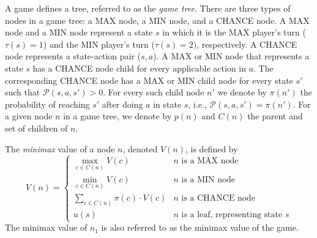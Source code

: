 \documentclass[runningheads]{llncs}
\newcommand{\MM}{\mathit{V}}
\newcommand{\rootnode}{\mathit{n_1}}
\begin{document}
A game defines a tree, referred to as the \emph{game tree}. There are three types of nodes in a game tree: a MAX node, a MIN node, and a CHANCE node. 
A MAX node and a MIN node represent a state $s$ in which it is the MAX player's  turn ($\tau(s)=1$) and the MIN player's turn ($\tau(s)=2)$, respectively. 
A CHANCE node represents a state-action pair ($s,a$). 
A MAX or MIN node that represents a state $s$ 
has a CHANCE node child for every applicable action in $a$. 
The corresponding CHANCE node has a MAX or MIN child node for every state $s'$ 
such that $\mathcal{P}(s,a,s')>0$. For every such child node $n'$ we denote by $\pi(n')$ the probability of reaching $s'$ after doing $a$ in state $s$, i.e., $\mathcal{P}(s,a,s')=\pi(n')$. 
For a given node $n$ in a game tree, we denote by $p(n)$ and $C(n)$ the parent and set of children of $n$. 



The \emph{minimax} value of a node $n$, denoted $\MM(n)$, is defined by
\begin{equation} 
\MM(n) =
\begin{cases} 
      \max\limits_{c\in C(n)} \MM(c) & n \text{ is a MAX node} \\
      \min\limits_{c\in C(n)} \MM(c) & n \text{ is a MIN node} \\
      \sum\limits_{c\in C(n)} \pi(c)\cdot \MM(c) & n \text{ is a CHANCE node} \\
      u(s) & n \text{ is a leaf, representing state $s$}
   \end{cases}
   \label{eq:mm-value-chance}
\end{equation}
The minimax value of $\rootnode{}$ is also referred to as the minimax value of the game. 
\end{document}
